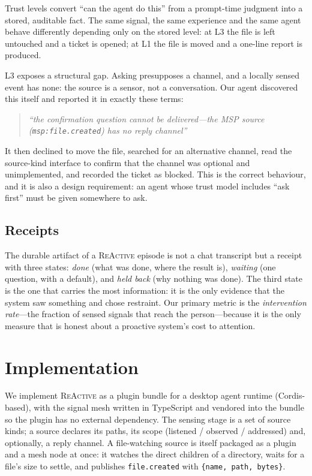 \documentclass[10pt,a4paper]{article}
\newcommand{\sys}{\textsc{ReActive}}
\begin{document}
Trust levels convert ``can the agent do this'' from a prompt-time judgment
into a stored, auditable fact. The same signal, the same experience and the
same agent behave differently depending only on the stored level: at L3 the
file is left untouched and a ticket is opened; at L1 the file is moved and a
one-line report is produced.

L3 exposes a structural gap. Asking presupposes a channel, and a locally
sensed event has none: the source is a sensor, not a conversation. Our agent
discovered this itself and reported it in exactly these terms:

\begin{quote}\small\itshape
``the confirmation question cannot be delivered---the MSP source
(\texttt{msp:file.created}) has no reply channel''
\end{quote}

It then declined to move the file, searched for an alternative channel, read
the source-kind interface to confirm that the channel was optional and
unimplemented, and recorded the ticket as blocked. This is the correct
behaviour, and it is also a design requirement: an agent whose trust model
includes ``ask first'' must be given somewhere to ask.

\subsection{Receipts}

The durable artifact of a \sys{} episode is not a chat transcript but a
receipt with three states: \emph{done} (what was done, where the result is),
\emph{waiting} (one question, with a default), and \emph{held back} (why
nothing was done). The third state is the one that carries the most
information: it is the only evidence that the system saw something and chose
restraint. Our primary metric is the \emph{intervention rate}---the fraction
of sensed signals that reach the person---because it is the only measure
that is honest about a proactive system's cost to attention.

\section{Implementation}
\label{sec:impl}

We implement \sys{} as a plugin bundle for a desktop agent runtime
(Cordis-based), with the signal mesh written in TypeScript and vendored into
the bundle so the plugin has no external dependency. The sensing stage is a
set of source kinds; a source declares its paths, its scope (listened /
observed / addressed) and, optionally, a reply channel. A file-watching
source is itself packaged as a plugin and a mesh node at once: it watches the
direct children of a directory, waits for a file's size to settle, and
publishes \texttt{file.created} with \texttt{\{name, path, bytes\}}.
\end{document}

